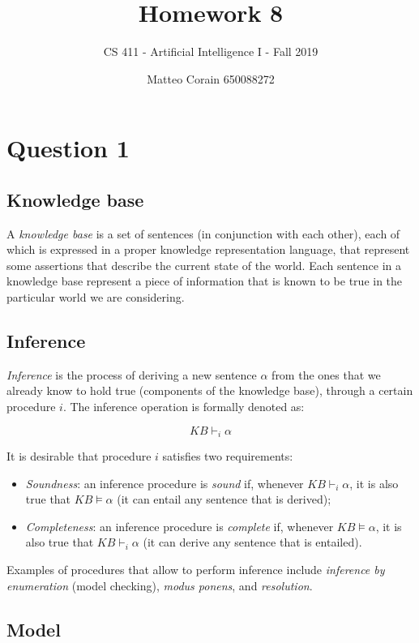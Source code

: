 \documentclass[letterpaper,headings=standardclasses]{scrartcl}
\title{Homework 8}
\subtitle{CS 411 - Artificial Intelligence I - Fall 2019}
\author{Matteo Corain 650088272}
\begin{document}
\maketitle

\section{Question 1}

\subsection{Knowledge base}

A \emph{knowledge base} is a set of sentences (in conjunction with each other), each of which is expressed in a proper knowledge representation language, that represent some assertions that describe the current state of the world. Each sentence in a knowledge base represent a piece of information that is known to be true in the particular world we are considering.

\subsection{Inference}

\emph{Inference} is the process of deriving a new sentence $\alpha$ from the ones that we already know to hold true (components of the knowledge base), through a certain procedure $i$. The inference operation is formally denoted as:

$$ KB \vdash_i \alpha $$

It is desirable that procedure $i$ satisfies two requirements:

\begin{itemize}
    \item \emph{Soundness}: an inference procedure is \emph{sound} if,	whenever $ KB \vdash_i \alpha $, it is also true that $ KB \models \alpha $ (it can entail any sentence that is derived);
    \item \emph{Completeness}: an inference procedure is \emph{complete} if, whenever $ KB \models \alpha $, it is also true that $ KB \vdash_i \alpha $ (it can derive any sentence that is entailed).
\end{itemize}

Examples of procedures that allow to perform inference include \emph{inference by enumeration} (model checking), \emph{modus ponens}, and \emph{resolution}.

\subsection{Model}
\end{document}
